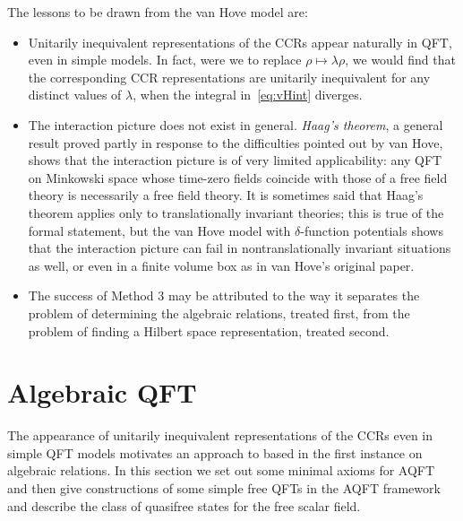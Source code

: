 \documentclass[12pt]{article}
\newcommand{\1}{\mathds{1}}                         %
\begin{document}
	The lessons to be drawn from the van Hove model are:
	\begin{itemize}
		\item Unitarily inequivalent representations of the CCRs appear naturally in QFT, even in simple models. In fact, were we to replace $\rho\mapsto  \lambda\rho$, we would find that the corresponding CCR representations are unitarily inequivalent for any distinct values of $\lambda$, when the integral in~\eqref{eq:vHint} diverges.
		\item The interaction picture does not exist in general.  \emph{Haag's theorem}, a general result proved partly in response to the difficulties pointed out by van Hove, shows that the interaction picture is of very limited applicability: any QFT on Minkowski space whose time-zero fields coincide with those of a free field theory is necessarily a free field theory. It is sometimes said that Haag's theorem applies only to translationally invariant theories; this is true of the formal statement, but the van Hove model with $\delta$-function potentials shows that the interaction picture can fail in nontranslationally invariant situations as well, or even in a finite volume box as in van Hove's original paper.
		\item The success of Method 3 may be attributed to the way it separates the problem of determining the algebraic relations, treated first, from the problem of finding a Hilbert space representation, treated second. 
	\end{itemize} 
	
	
	\section{Algebraic QFT}\label{sec:AQFT}
	The appearance of unitarily inequivalent representations of the CCRs even in simple QFT models motivates an approach to based in the first instance on algebraic relations. In this section we set out some minimal axioms for AQFT and then give constructions of some simple free QFTs in the AQFT framework and describe the class of quasifree states for the free scalar field. 
\end{document}
